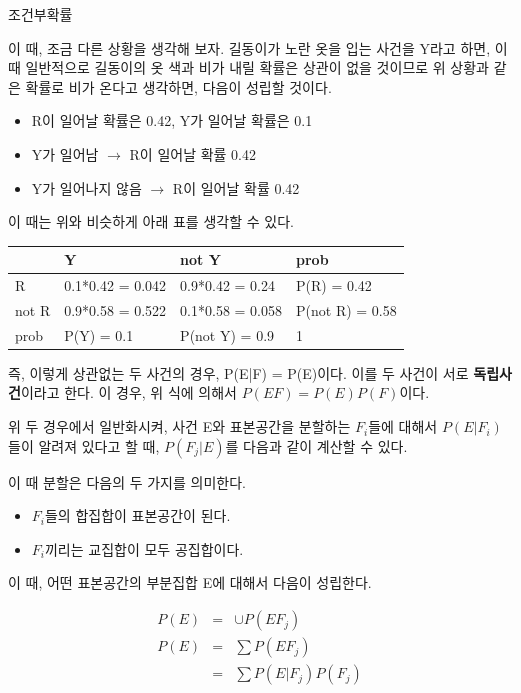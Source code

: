 \documentclass{beamer}
\begin{document}
\begin{frame}[allowframebreaks]{조건부확률}
\framebreak


이 때, 조금 다른 상황을 생각해 보자. 길동이가 노란 옷을 입는 사건을 Y라고 하면, 이 때 일반적으로 길동이의 옷 색과 비가 내릴 확률은 상관이 없을 것이므로 위 상황과 같은 확률로 비가 온다고 생각하면, 다음이 성립할 것이다. 

\begin{itemize} 
\item R이 일어날 확률은 0.42, Y가 일어날 확률은 0.1
\item Y가 일어남 $\rightarrow$  R이 일어날 확률 0.42
\item Y가 일어나지 않음 $\rightarrow$ R이 일어날 확률 0.42 
\end{itemize}

\framebreak

이 때는 위와 비슷하게 아래 표를 생각할 수 있다. 

\begin{table}[]
\begin{tabular}{|l|l|l|l|}
\hline
      & Y             & not Y          & prob \\ \hline
R     & 0.1*0.42 = 0.042 & 0.9*0.42 = 0.24 & P(R) = 0.42 \\ \hline
not R & 0.9*0.58 = 0.522 & 0.1*0.58 = 0.058 & P(not R) = 0.58 \\ \hline
prob  & P(Y) = 0.1     & P(not Y) = 0.9            & 1    \\ \hline
\end{tabular}
\end{table}

즉, 이렇게 상관없는 두 사건의 경우, P(E|F) = P(E)이다. 이를 두 사건이 서로 \textbf{독립사건}이라고 한다. 이 경우, 위 식에 의해서 $P(E  F) = P(E)P(F)$이다. 


\framebreak



위 두 경우에서 일반화시켜, 사건 E와 표본공간을 분할하는 $F_i$들에 대해서 $P(E|F_i)$들이 알려져 있다고 할 때, $P(F_j|E)$를 다음과 같이 계산할 수 있다. 

이 때 분할은 다음의 두 가지를 의미한다. 

\begin{itemize} 
\item $F_i$들의 합집합이 표본공간이 된다. 
\item $F_i$끼리는 교집합이 모두 공집합이다. 
\end{itemize}


이 때, 어떤 표본공간의 부분집합 E에 대해서 다음이 성립한다. 

\begin{eqnarray} 
P(E) &=& \cup P(EF_j) \\ 
P(E) &=& \sum P(EF_j) \\ 
&=& \sum P(E|F_j)P(F_j)
\end{eqnarray}


\end{frame}
\end{document}
